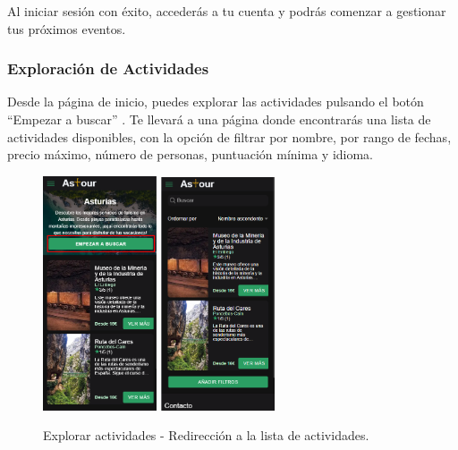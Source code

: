 Al iniciar sesión con éxito, accederás a tu cuenta y podrás comenzar a gestionar tus próximos eventos.

\subsubsection{Exploración de Actividades}
Desde la página de inicio, puedes explorar las actividades pulsando el botón “Empezar a buscar” .
Te llevará a una página donde encontrarás una lista de actividades disponibles, con la opción de filtrar por nombre, por rango de fechas, precio máximo, número de personas, puntuación mínima y idioma.
\begin{figure}[H]
	\centering
	\includegraphics[width=0.3\textwidth]{7-Construccion/Manuales/mobile/empezar a buscar.png}
	\includegraphics[width=0.3\textwidth]{7-Construccion/Manuales/mobile/lista de actividades.png}
	\caption{Explorar actividades - Redirección a la lista de actividades.}
\end{figure}

